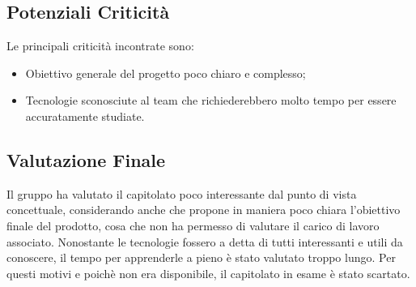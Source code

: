 \subsection{Potenziali Criticità}
	Le principali criticità incontrate sono:
	\begin{itemize}
		\item Obiettivo generale del progetto poco chiaro e complesso;
		\item Tecnologie sconosciute al team che richiederebbero molto tempo per essere accuratamente studiate.
	\end{itemize}

\subsection{Valutazione Finale}
	Il gruppo ha valutato il capitolato poco interessante dal punto di vista concettuale, considerando anche che propone in maniera poco chiara l'obiettivo finale del prodotto, cosa che non ha permesso di valutare il carico di lavoro associato. Nonostante le tecnologie fossero a detta di tutti interessanti e utili da conoscere, il tempo per apprenderle a pieno è stato valutato troppo lungo. Per questi motivi e poichè non era disponibile, il capitolato in esame è stato scartato.